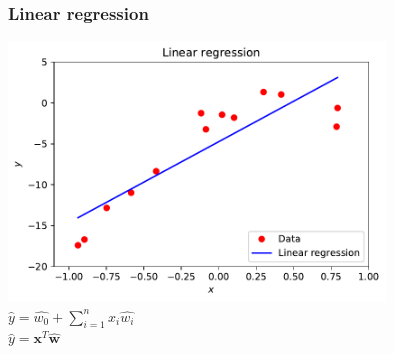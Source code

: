 \documentclass[notes]{beamer}          %
\newcommand{\vect}[1]{\bm{#1}}
\begin{document}
\begin{frame}
\frametitle{Linear regression}
    \begin{center}
            \includegraphics[width=0.75\textwidth]{../figures/week_1/linear_regression.pdf} \\
            $\hat{y} = \hat{w_0} + \sum_{i=1}^{n} x_i \hat{w_i}$ \\
            $\hat{y} = \vect{x}^T \hat{\vect{w}}$
    \end{center}
\end{frame}
\end{document}
